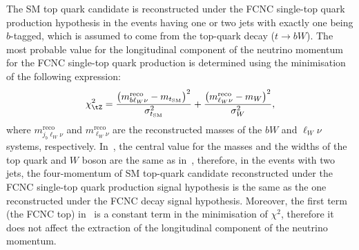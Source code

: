 The SM top quark candidate is reconstructed under the FCNC single-top quark production hypothesis in the events having one or two jets with exactly one being $b$-tagged, which is assumed to come from the top-quark decay ($t\to bW$). 
The most probable value for the longitudinal component of the neutrino momentum for the FCNC single-top quark production is determined using the minimisation of the following expression:
\begin{equation}
\chi^2_{\tZ}  = 
\frac{\left(m^{\mathrm{reco}}_{b\ell_W\nu}-m_{t_{\mathrm{SM}}}\right)^2}{\sigma_{t_{\mathrm{SM}}}^2}
+ \frac{\left(m^{\mathrm{reco}}_{\ell_W\nu}-m_W\right)^2}{\sigma_W^2},
\label{eq:chi2tZ}
\end{equation}
where $m^{\mathrm{reco}}_{j_b\ell_W\nu}$ and $m^{\mathrm{reco}}_{\ell_W\nu}$ are 
the reconstructed masses of the $bW$ and $\ell_W\nu$ systems, respectively.
In~, the central value for the masses and the widths
of the top quark and $W$ boson are the same as in~, therefore, in the events with two jets,
the four-momentum of SM top-quark candidate reconstructed under the FCNC single-top quark
production signal hypothesis is the same as the one reconstructed under the FCNC \ttbar decay signal hypothesis. 
Moreover, the first term (the FCNC top) in~ is a constant term in the minimisation of $\chi^{2}$, therefore it does not affect the extraction of the longitudinal component of the neutrino momentum.


